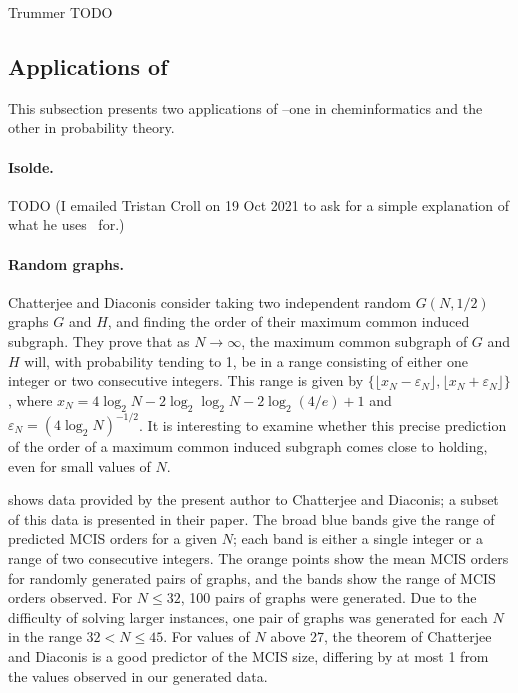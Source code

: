 Trummer \cite{trummer2021} TODO

\subsection{Applications of \McSplit}

This subsection presents two applications of \McSplit\---one in cheminformatics
and the other in probability theory.

\paragraph{Isolde.} TODO (I emailed Tristan Croll on 19 Oct 2021 to ask for a simple explanation of
what he uses \McSplit\ for.)

\paragraph{Random graphs.} Chatterjee and Diaconis \cite{chatterjee2021isomorphisms} consider taking two
independent random $G(N, 1/2)$ graphs $G$ and $H$, and finding the order of their maximum
common induced subgraph.  They prove that as $N\to\infty$, the maximum common
subgraph of $G$ and $H$ will, with probability tending to 1, be in a range
consisting of either one integer or two consecutive integers.  This range
is given by $\{\lfloor x_N - \varepsilon_N\rfloor, \lfloor x_N + \varepsilon_N\rfloor\}$,
where $x_N = 4 \log_2 N - 2 \log_2\log_2 N - 2 \log_2(4/e) + 1$
and $\varepsilon_N = (4 \log_2 N)^{-1/2}$.  It is interesting to examine whether
this precise prediction of the order of a maximum common induced subgraph
comes close to holding, even for small values of $N$.

shows data provided by the present author to Chatterjee and Diaconis; a subset
of this data is presented in their paper.  The broad blue bands give the
range of predicted MCIS orders for a given $N$; each band is either a single
integer or a range of two consecutive integers.  The orange points show the mean
MCIS orders for randomly generated pairs of graphs, and the bands show the
range of MCIS orders observed.  For $N \leq 32$, 100 pairs of graphs were
generated.  Due to the difficulty of solving larger instances, one pair
of graphs was generated for each $N$ in the range $32 < N \leq 45$.  For values
of $N$ above 27, the theorem of Chatterjee and Diaconis is a good predictor
of the MCIS size, differing by at most 1 from the values observed in our
generated data.

